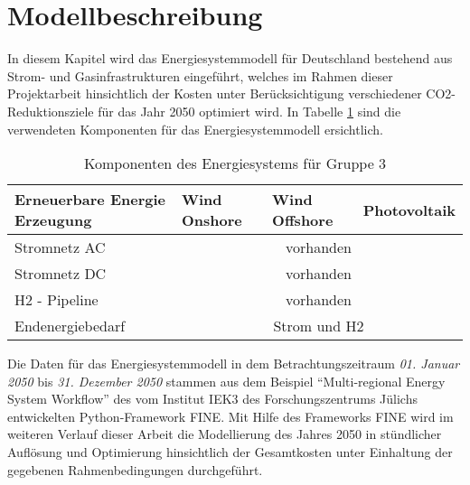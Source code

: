 \section{Modellbeschreibung}
\label{chap:modellbeschreibung}
In diesem Kapitel wird das Energiesystemmodell für Deutschland bestehend aus Strom- und Gasinfrastrukturen eingeführt, welches im Rahmen dieser Projektarbeit hinsichtlich der Kosten unter Berücksichtigung verschiedener CO2-Reduktionsziele für das Jahr 2050 optimiert wird. In Tabelle \ref{tab:systemdesign2} sind die verwendeten Komponenten für das Energiesystemmodell ersichtlich.

\begin{table}[ht!]
    \begin{tabular}{|lcll|}
        \hline
        \multicolumn{1}{|l|}{Erneuerbare Energie Erzeugung} & \multicolumn{1}{l|}{Wind Onshore} & \multicolumn{1}{l|}{Wind Offshore} & Photovoltaik \\ \hline
        \multicolumn{1}{|l|}{Stromnetz AC}     & \multicolumn{3}{c|}{vorhanden}                \\ \hline
        \multicolumn{1}{|l|}{Stromnetz DC}     & \multicolumn{3}{c|}{vorhanden}                \\ \hline
        \multicolumn{1}{|l|}{H2 - Pipeline}    & \multicolumn{3}{c|}{vorhanden}                \\ \hline
        \multicolumn{1}{|l|}{Endenergiebedarf} & \multicolumn{3}{c|}{Strom und H2} \\ \hline
    \end{tabular}
    \caption{Komponenten des Energiesystems für Gruppe 3}
    \label{tab:systemdesign2}
\end{table}

Die Daten für das Energiesystemmodell in dem Betrachtungszeitraum \textit{01. Januar 2050} bis \textit{31. Dezember 2050} stammen aus dem Beispiel ``Multi-regional Energy System Workflow'' des vom Institut IEK3 des Forschungszentrums Jülichs entwickelten Python-Framework FINE. 
Mit Hilfe des Frameworks FINE wird im weiteren Verlauf dieser Arbeit die Modellierung des Jahres 2050 in stündlicher Auflösung und Optimierung hinsichtlich der Gesamtkosten unter Einhaltung der gegebenen Rahmenbedingungen durchgeführt.


